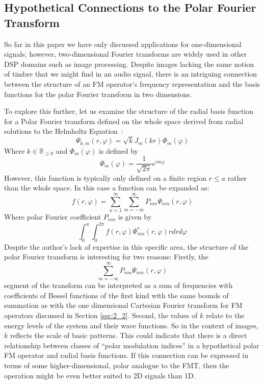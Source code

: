 \documentclass[11pt,twoside]{report}
\numberwithin{thm}{section}
\numberwithin{equation}{section}
\newcommand{\R}{{\mathbb{R}}}
\begin{document}
\subsection{Hypothetical Connections to the Polar Fourier Transform}
So far in this paper we have only discussed applications for one-dimensional signals; however, two-dimensional Fourier transforms are widely used in other DSP domains such as image processing. Despite images lacking the same notion of timbre that we might find in an audio signal, there is an intriguing connection between the structure of an FM operator's frequency representation and the basis functions for the polar Fourier transform in two dimensions. 

To explore this further, let us examine the structure of the radial basis function for a Polar Fourier transform defined on the whole space derived from radial solutions to the Helmholtz Equation~\cite{WRB08}: 
\begin{equation}
    \Psi_{k,m}(r,\varphi) = \sqrt{k}J_m(kr)\Phi_m(\varphi)
\end{equation}
Where $k\in \R_{\geq0}$ and $\Phi_m(\varphi)$ is defined by
\begin{equation}
    \Phi_m(\varphi) = \frac{1}{\sqrt{2\pi}}e^{im\varphi}
\end{equation}
However, this function is typically only defined on a finite region $r \leq a$ rather than the whole space. In this case a function can be expanded as:
\begin{equation*}
    f(r, \varphi) = \sum_{n=1}^\infty \sum_{m=-\infty}^\infty P_{nm}\Psi_{nm}(r,\varphi)
\end{equation*}
Where polar Fourier coefficient $P_{nm}$ is given by
\begin{equation}
    \int_0^a\int_{0}^{2\pi}f(r,\varphi)\Psi^*_{nm}(r, \varphi)rdrd\varphi
\end{equation}
Despite the author's lack of expertise in this specific area, the structure of the polar Fourier transform is interesting for two reasons: Firstly, the 
$$\sum_{m=-\infty}^\infty P_{nm}\Psi_{nm}(r,\varphi)$$
segment of the transform can be interpreted as a sum of frequencies with coefficients of Bessel functions of the first kind with the same bounds of summation as with the one dimensional Cartesian Fourier transform for FM operators discussed in Section \ref{sec:2_2}. Second, the values of $k$ relate to the energy levels of the system and their wave functions. So in the context of images, $k$ reflects the scale of basic patterns. This could indicate that there is a direct relationship between classes of ``polar modulation indices'' in a hypothetical polar FM operator and radial basis functions. If this connection can be expressed in terms of some higher-dimensional, polar analogue to the FMT, then the operation might be even better suited to 2D signals than 1D.
\end{document}
